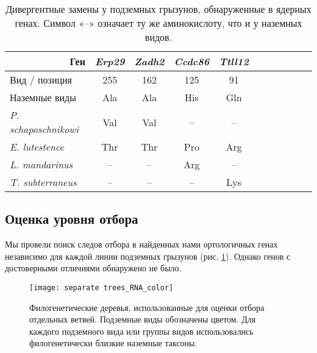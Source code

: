 \begin{table}[h!]
	\caption{Дивергентные замены у подземных грызунов, обнаруженные в ядерных генах. Символ «--» означает ту же аминокислоту, что и у наземных видов.}\label{rna_substitution_diff} \vspace{5mm}
	
	\begin{center}
	\begin{tabular}{|l|c|c|c|c|c|c|c|c|c|c}
		\hline
		\multicolumn{1}{|r|}{Ген} & \textit{Erp29} & \textit{Zadh2} & \textit{Ccdc86} & \textit{Ttll12} \\ \hline
		Вид   / позиция & 255 & 162 & 125 &  91 \\ \hline
		Наземные виды & Ala & Ala & His & Gln \\ \hline
		\textit{P. schaposchnikowi} & Val & Val & -- & -- \\ \hline
		\textit{E. lutestence} & Thr & Thr & Pro & Arg \\ \hline
		\textit{L. mandarinus} & -- & -- & Arg  & -- \\ \hline
		\textit{T. subterraneus} & -- & -- & -- & Lys \\ \hline
	\end{tabular}
\end{center}
\end{table}

\subsection{Оценка уровня отбора} 


Мы провели поиск следов отбора в найденных нами ортологичных генах независимо для каждой линии подземных грызунов (рис. \ref{RNA_trees_sep}). Однако генов с достоверными отличиями обнаружено не было. 

\begin{figure}[h!]
	\begin{center}
		\texttt{[image: separate trees\_RNA\_color]}
	\end{center}
	\caption{Филогенетические деревья, использованные для оценки отбора отдельных ветвей. Подземные виды обозначены цветом. Для каждого подземного вида или группы видов использовались филогенетически близкие наземные таксоны.}\label{RNA_trees_sep}
\end{figure}